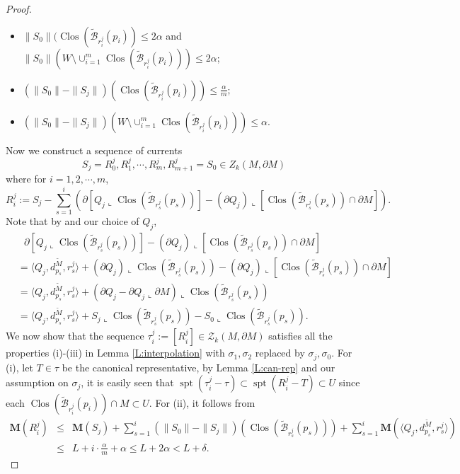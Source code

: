 \documentclass[10pt]{amsart}
\theoremstyle{definition}
\theoremstyle{remark}
\numberwithin{equation}{section}
\newcommand{\al}{\alpha}
\newcommand{\lan}{\langle}
\newcommand{\ran}{\rangle}
\newcommand{\lc}{\llcorner}
\newcommand{\si}{\sigma}
\newcommand{\de}{\delta}
\newcommand{\Z}{\mathcal{Z}}
\newcommand{\M}{\mathbf{M}}
\newcommand{\tM}{\widetilde{M}}
\newcommand{\tBcal}{\widetilde{\mathcal{B}}}
\newcommand{\spt}{\operatorname{spt}}
\newcommand{\Clos}{\operatorname{Clos}}
\begin{document}
\begin{proof}
\begin{itemize}
\item $\|S_0\| (\Clos(\tBcal_{r_i^j}(p_i)) \leq 2\al$ and $\|S_0\| (W \setminus \cup_{i=1}^m \Clos(\tBcal_{r_i^j}(p_i))) \leq 2\al$;
\item $(\|S_0\|-\|S_j\|) (\Clos(\tBcal_{r_i^j}(p_i)))\leq \frac{\al}{m}$;
\item $(\|S_0\|-\|S_j\|) (W \setminus \cup_{i=1}^m \Clos(\tBcal_{r_i^j}(p_i))) \leq \al$.
\end{itemize}
Now we construct a sequence of currents 
\[ S_j=R^j_0, R^j_1,\cdots,R^j_m, R^j_{m+1}=S_0 \in Z_k(M,\partial M) \] 
where for $i=1,2,\cdots,m$,
\begin{equation}
\label{currents connecting S_j to S_0}
R^j_i:=S_j-\sum_{s=1}^i \left( \partial [Q_j\lc \Clos(\tBcal_{r_s^j}(p_s))]-(\partial Q_j) \lc [ \Clos(\tBcal_{r_s^j}(p_s)) \cap \partial M] \right).
\end{equation}
Note that by \cite[28.5(2)]{Simon} and our choice of $Q_j$,
\begin{equation*}
\begin{split}
& \ \ \ \partial [Q_j\lc \Clos(\tBcal_{r_s^j}(p_s))]-(\partial Q_j) \lc [ \Clos(\tBcal_{r_s^j}(p_s)) \cap \partial M] \\
& = \lan Q_j, d^{\tM}_{p_s}, r^j_s\ran + (\partial Q_j) \lc \Clos(\tBcal_{r^j_s}(p_s)) -(\partial Q_j)\lc [\Clos(\tBcal_{r^j_s}(p_s)) \cap \partial M]\\
& = \lan Q_j, d^{\tM}_{p_s}, r^j_s\ran + (\partial Q_j-\partial Q_j \lc \partial M) \lc \Clos(\tBcal_{r^j_s}(p_s))\\
& = \lan Q_j, d^{\tM}_{p_s}, r^j_s\ran + S_j\lc \Clos(\tBcal_{r^j_s}(p_s))- S_0\lc \Clos(\tBcal_{r^j_s}(p_s)).
\end{split}
\end{equation*}
We now show that the sequence $\tau^j_i:=[R^j_i] \in \Z_k(M,\partial M)$ satisfies all the properties (i)-(iii) in Lemma \ref{L:interpolation} with $\si_1, \si_2$ replaced by $\si_j, \si_0$. For (i), let $T \in \tau$ be the canonical representative, by Lemma \ref{L:can-rep} and our assumption on $\si_j$, it is easily seen that $\spt(\tau^j_i-\tau)\subset \spt(R^j_i-T)\subset U$ since each $\Clos(\tBcal_{r_i^j}(p_i)) \cap M \subset U$.  For (ii), it follows from
\begin{eqnarray*}
\M(R^j_i) & \leq & \M(S_j)+\sum_{s=1}^i(\|S_0\|-\|S_j\|)( \Clos(\tBcal_{r^j_s}(p_s))) +\sum_{s=1}^i \M(\lan Q_j, d^{\tM}_{p_s}, r^j_s\ran)\\
                   & \leq &  L+i\cdot\frac{\al}{m}+\al\leq L+2\al<L+\de.
\end{eqnarray*}

\end{proof}
\end{document}
